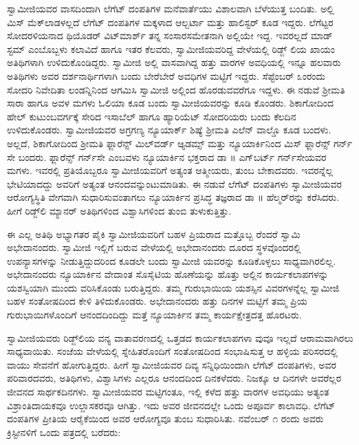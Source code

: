 ಸ್ವಾಮೀಜಿಯವರ ವಾಸದಿಂದಾಗಿ ಲೆಗೆಟ್ ದಂಪತಿಗಳ ಮನೆವಾರ್ತೆಯು ವಿಶಾಲವಾಗಿ ಬೆಳೆಯುತ್ತ ಬಂದಿತು. ಅಲ್ಲಿ ಮಿಸ್ ಮೆಕ್​ಲಾಡಳಲ್ಲದೆ ಲೆಗೆಟ್ ದಂಪತಿಗಳ ಮಕ್ಕಳಾದ ಆಲ್ಬರ್ಟಾ ಮತ್ತು ಹಾಲಿಸ್ಟರ್ ಕೂಡ ಇದ್ದರು. ಲೆಗೆಟ್ಟರ ಸೋದರಳಿಯನಾದ ಥಿಯೊಡರ್ ವಿಟ್​ಮಾರ್ಶ್ ತನ್ನ ಸಂಸಾರಸಮೇತನಾಗಿ ಅಲ್ಲಿಯೇ ಇದ್ದ. ಇವರಲ್ಲದೆ ಮಾಡ್ ಸ್ಟಮ್ ಎಂಬೊಬ್ಬಳು ಕಲಾವಿದೆ ಹಾಗೂ ಇತರ ಕೆಲವರು, ಸ್ವಾಮೀಜಿಯವರಿದ್ದ ವೇಳೆಯಲ್ಲಿ ರಿಡ್ಜ್ ಲಿಯ ಖಾಯಂ ಅತಿಥಿಗಳಾಗಿ ಉಳಿದುಕೊಂಡಿದ್ದರು. ಸ್ವಾಮೀಜಿ ಅಲ್ಲಿ ವಾಸವಾಗಿದ್ದ ಹತ್ತು ವಾರಗಳ ಅವಧಿಯಲ್ಲಿ ಇನ್ನೂ ಹಲವಾರು ಅತಿಥಿಗಳು ಅವರ ದರ್ಶನಾರ್ಥಿಗಳಾಗಿ ಬಂದು ಬೇರೆಬೇರೆ ಅವಧಿಗಳ ಮಟ್ಟಿಗೆ ಇದ್ದರು. ಸೆಪ್ಟೆಂಬರ್ ೩ಂರಂದು ಸೋದರಿ ನಿವೇದಿತಾ ಲಂಡನ್ನಿನಿಂದ ಆಗಮಿಸಿ ಸ್ವಾಮೀಜಿ ಅಲ್ಲಿಂದ ಹೊರಡುವವರೆಗೂ ಇದ್ದಳು. ಈ ನಡುವೆ ಶ್ರೀಮತಿ ಸಾರಾ ಹಾಗೂ ಅವಳ ಮಗಳು ಓಲಿಯಾ ಕೂಡ ಬಂದು ಸ್ವಾಮೀಜಿಯವರನ್ನು ಕೂಡಿ ಕೊಂಡರು. ಶಿಕಾಗೋದಿಂದ ಹೇಲ್ ಕುಟುಂಬವರ್ಗಕ್ಕೆ ಸೇರಿದ ಇಸಾಬೆಲ್ ಹಾಗೂ ಹ್ಯಾರಿಯೆಟ್ ಸೋದರಿಯರು ಬಂದು ಕೆಲದಿನ ಉಳಿದುಕೊಂಡರು. ಸ್ವಾಮೀಜಿಯವರ ಅಗ್ರಗಣ್ಯ ನ್ಯೂಯಾರ್ಕ್ ಶಿಷ್ಯೆ ಶ್ರೀಮತಿ ಎಲೆನ್ ವಾಲ್ಡೊ ಕೂಡ ಬಂದಳು. ಅಲ್ಲದೆ, ಶಿಕಾಗೋದಿಂದ ಶ್ರೀಮತಿ ಫ್ಲಾರೆನ್ಸ್ ಮಿಲ್​ವರ್ಡ್ ಆ್ಯಡಮ್ಸ್ ಮತ್ತು ನ್ಯೂಯಾರ್ಕಿನಿಂದ ಮಿಸ್ ಫ್ಲಾರೆನ್ಸ್ ಗರ್ನ್​ಸೇ ಬಂದರು. ಫ್ಲಾರೆನ್ಸ್ ಗರ್ನ್​ಸೇ ಎಂಬವಳು ನ್ಯೂಯಾರ್ಕಿನ ಭಕ್ತರಾದ ಡಾ ॥ ಎಗ್​ಬರ್ಟ್ ಗರ್ನ್​ಸೇಯವರ ಮಗಳು. ಇವರಲ್ಲಿ ಪ್ರತಿಯೊಬ್ಬರೂ ಸ್ವಾಮೀಜಿಯವರಿಗೆ ಅತ್ಯಂತ ಆತ್ಮೀಯರು, ತುಂಬ ಬೇಕಾದವರು. ಇವರನ್ನೆಲ್ಲ ಭೇಟಿಯಾದದ್ದು ಅವರಿಗೆ ಅತ್ಯಂತ ಆನಂದವನ್ನುಂಟುಮಾಡಿತು. ಈ ನಡುವೆ ಲೆಗೆಟ್ ದಂಪತಿಗಳು ಸ್ವಾಮೀಜಿಯವರ ಆರೋಗ್ಯಸ್ಥಿತಿ ವೇಗವಾಗಿ ಸುಧಾರಿಸುವಂತಾಗಲು ನ್ಯೂಯಾರ್ಕಿನ ಪ್ರಸಿದ್ಧ ತಜ್ಞರಾದ ಡಾ ॥ ಹೆಲ್ಮರ್​ರನ್ನು ಕರೆಸಿದರು. ಹೀಗೆ ರಿಡ್ಜ್​ಲಿ ಮ್ಯಾನರ್ ಅತಿಥಿಗಳಿಂದ ವಿಶ್ವಾಸಿಗಳಿಂದ ತುಂಬಿ ತುಳುಕುತ್ತಿತ್ತು.

ಈ ಎಲ್ಲ ಅತಿಥಿ ಅಭ್ಯಾಗತರ ಪೈಕಿ ಸ್ವಾಮೀಜಿಯವರಿಗೆ ಬಹಳ ಪ್ರಿಯರಾದ ಮತ್ತೊಬ್ಬ ರೆಂದರೆ ಸ್ವಾಮಿ ಅಭೇದಾನಂದರು. ಸ್ವಾಮೀಜಿ ಇಲ್ಲಿಗೆ ಬರುವ ವೇಳೆಯಲ್ಲಿ ಅಭೇದಾನಂದರು ದೂರದ ಸ್ಥಳವೊಂದರಲ್ಲಿ ಉಪನ್ಯಾಸಗಳನ್ನು ನೀಡುತ್ತಿದ್ದುದರಿಂದ ಕೂಡಲೇ ಬಂದು ಸ್ವಾಮೀಜಿ ಯವರನ್ನು ಕೂಡಿಕೊಳ್ಳಲು ಸಾಧ್ಯವಾಗಿರಲಿಲ್ಲ. ಅಭೇದಾನಂದರು ನ್ಯೂಯಾರ್ಕಿನ ವೇದಾಂತ ಸೊಸೈಟಿಯ ಹೊಣೆಯನ್ನು ಹೊತ್ತು ಅಲ್ಲಿನ ಕಾರ್ಯಕಲಾಪಗಳನ್ನು ಯಶಸ್ವಿಯಾಗಿ ಮುಂದು ವರಿಸಿಕೊಂಡು ಬರುತ್ತಿದ್ದರು. ತಮ್ಮ ಗುರುಭಾಯಿಯ ಯಶಸ್ಸಿನ ವಿವರಗಳನ್ನೆಲ್ಲ ಸ್ವಾಮೀಜಿ ಬಹಳ ಸಂತೋಷದಿಂದ ಕೇಳಿ ತಿಳಿದುಕೊಂಡರು. ಅಭೇದಾನಂದರು ಹತ್ತು ದಿನಗಳ ಮಟ್ಟಿಗೆ ತಮ್ಮ ಪ್ರಿಯ ಗುರುಭಾಯಿಗಳೊಂದಿಗೆ ಆನಂದದಿಂದಿದ್ದು ಮತ್ತೆ ನ್ಯೂಯಾರ್ಕಿನ ತಮ್ಮ ಕಾರ್ಯಕ್ಷೇತ್ರದತ್ತ ಹೊರಟರು.

ಸ್ವಾಮೀಜಿಯವರು ರಿಡ್ಜ್​ಲಿಯ ವನ್ಯ ವಾತಾವರಣದಲ್ಲಿ ಒತ್ತಡದ ಕಾರ್ಯಕಲಾಪಗಳಾ ವುವೂ ಇಲ್ಲದೆ ಆರಾಮವಾಗಿರಲು ಸಾಧ್ಯವಾಯಿತು. ಸಂಜೆಯ ವೇಳೆಯಲ್ಲಿ ಸ್ನೇಹಿತರೊಂದಿಗೆ ಸಂತೋಷದಿಂದ ಸಂಭಾಷಿಸುತ್ತ ಆ ಹಳ್ಳಿಯ ಪರಿಸರದಲ್ಲಿ ವಾಯು ಸೇವನೆಗೆ ಹೋಗುತ್ತಿದ್ದರು. ಹೀಗೆ ಸ್ವಾಮೀಜಿಯವರ ದಿವ್ಯ ಸನ್ನಿಧಿಯಿಂದಾಗಿ ಲೆಗೆಟ್ ದಂಪತಿಗಳು, ಅವರ ಪರಿವಾರದವರು, ಅತಿಥಿಗಳು, ವಿಶ್ವಾಸಿಗಳು ಎಲ್ಲರೂ ಆನಂದದಿಂದ ದಿನಕಳೆದರು. ನಿಜಕ್ಕೂ ಆ ದಿನಗಳೇ ಅವರೆಲ್ಲರ ಜೀವನದ ಸಾರ್ಥಕದಿನಗಳು. ಸ್ವಾಮೀಜಿಯವರ ಮಟ್ಟಿಗಂತೂ, ಇಲ್ಲಿ ಕಳೆದ ಹತ್ತು ವಾರಗಳ ಅವಧಿಯು ಅತ್ಯಂತ ವಿಶ್ರಾಂತಿದಾಯಕವೂ ಉಲ್ಲಾಸಕರವೂ ಆಗಿತ್ತು. ಇದು ಅವರ ಜೀವನದಲ್ಲೇ ಒಂದು ಅಪೂರ್ವ ಕಾಲಾವಧಿ. ಲೆಗೆಟ್ ದಂಪತಿಗಳ ಪ್ರೀತಿಯ ಆರೈಕೆಯಿಂದ ಅವರ ಆರೋಗ್ಯವೂ ತುಂಬ ಸುಧಾರಿಸಿತು. ನವೆಂಬರ್ ೧ ರಂದು ಅವರು ಕ್ರಿಸ್ಟೀನಳಿಗೆ ಒಂದು ಪತ್ರದಲ್ಲಿ ಬರೆದರು:

